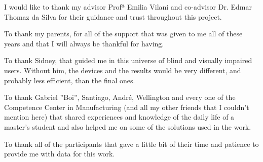 
I would like to thank my advisor Profª Emilia Vilani and co-advisor Dr. Edmar Thomaz da Silva for their guidance and trust throughout this project.

To thank my parents, for all of the support that was given to me all of these years and that I will always be thankful for having.

To thank Sidney, that guided me in this universe of blind and visually impaired users. Without him, the devices and the results would be very different, and probably less efficient, than the final ones.

To thank Gabriel ”Boi”, Santiago, André, Wellington and every one of the Competence Center in Manufacturing (and all my other friends that I couldn’t mention here) that shared experiences and knowledge of the daily life of a master’s student and also helped me on some of the solutions used in the work.

To thank all of the participants that gave a little bit of their time and patience to provide me with data for this work.

